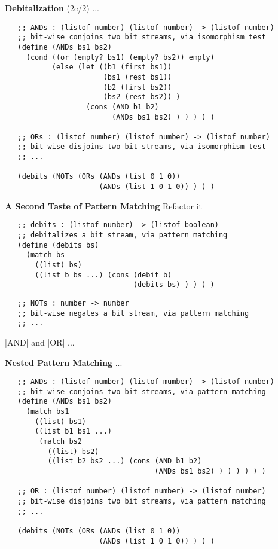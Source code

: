 \documentclass[14pt]{beamer}
\begin{document}
\begin{frame}[fragile]{{\bf Debitalization} (2c/2)}
 ...

 \pause

 {\scriptsize
  \begin{verbatim}
   ;; ANDs : (listof number) (listof number) -> (listof number)
   ;; bit-wise conjoins two bit streams, via isomorphism test
   (define (ANDs bs1 bs2)
     (cond ((or (empty? bs1) (empty? bs2)) empty)
           (else (let ((b1 (first bs1))
                       (bs1 (rest bs1))
                       (b2 (first bs2))
                       (bs2 (rest bs2)) )
                   (cons (AND b1 b2)
                         (ANDs bs1 bs2) ) ) ) ) )

   ;; ORs : (listof number) (listof number) -> (listof number)
   ;; bit-wise disjoins two bit streams, via isomorphism test
   ;; ...

   (debits (NOTs (ORs (ANDs (list 0 1 0))
                      (ANDs (list 1 0 1 0)) ) ) )
  \end{verbatim}
 }
\end{frame}

\begin{frame}[fragile]{\bf A Second Taste of Pattern Matching}
 Refactor it
 {\scriptsize
  \begin{verbatim}
   ;; debits : (listof number) -> (listof boolean)
   ;; debitalizes a bit stream, via pattern matching
   (define (debits bs)
     (match bs
       ((list) bs)
       ((list b bs ...) (cons (debit b)
                              (debits bs) ) ) ) )
  \end{verbatim}
 }

 \pause

 {\scriptsize
  \begin{verbatim}
   ;; NOTs : number -> number
   ;; bit-wise negates a bit stream, via pattern matching
   ;; ...
  \end{verbatim}
 }

 \pause

 |AND| and |OR| ...
\end{frame}

\begin{frame}[fragile]{\bf Nested Pattern Matching}
 ...

 {\scriptsize
  \begin{verbatim}
   ;; ANDs : (listof number) (listof mumber) -> (listof number)
   ;; bit-wise conjoins two bit streams, via pattern matching
   (define (ANDs bs1 bs2)
     (match bs1
       ((list) bs1)
       ((list b1 bs1 ...)
        (match bs2
          ((list) bs2)
          ((list b2 bs2 ...) (cons (AND b1 b2)
                                   (ANDs bs1 bs2) ) ) ) ) ) )

   ;; OR : (listof number) (listof number) -> (listof number)
   ;; bit-wise disjoins two bit streams, via pattern matching
   ;; ...

   (debits (NOTs (ORs (ANDs (list 0 1 0))
                      (ANDs (list 1 0 1 0)) ) ) )
  \end{verbatim}
 }
\end{frame}
\end{document}
